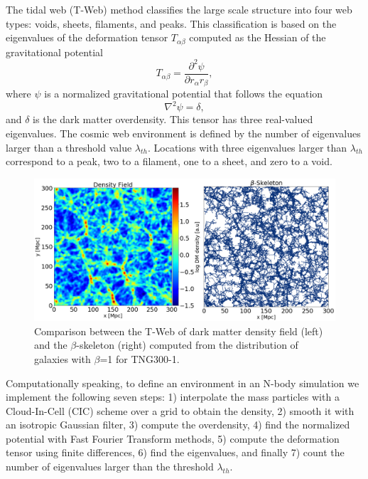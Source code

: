 \documentclass[usenatbib]{mnras}
\begin{document}
The tidal web (T-Web) method \citep{Hahn2007, Forero-Romero2009}
classifies the large scale structure into four web types: voids,
sheets, filaments, and peaks.   
This classification is based on the eigenvalues of the deformation
tensor $T_{\alpha\beta}$ computed as the Hessian of the gravitational potential 
\begin{equation}
T_{\alpha\beta}=\frac{\partial^2\psi}{\partial r_{\alpha}r_{\beta}},
\end{equation}
%
where $\psi$ is a normalized gravitational potential that follows the equation
\begin{equation}
    \nabla^2 \psi = \delta,
\end{equation}
%
and $\delta$ is the dark matter overdensity.
This tensor has three real-valued eigenvalues. 
The cosmic web environment is defined by the number of eigenvalues
larger than a threshold value $\lambda_{th}$.
Locations with three eigenvalues larger than $\lambda_{th}$ correspond
to a peak, two to a filament, one to a sheet, and zero to a void.


\begin{figure}
\centering
 \includegraphics[scale=0.3]{Figs/p_Fig1_.png}%
 \caption{Comparison between the T-Web of dark matter density field
   (left) and the $\beta$-skeleton (right) computed from the
   distribution of galaxies with $\beta$=1 for TNG300-1.}  
 \label{fig:TWebBsk}
\end{figure}


Computationally speaking, to define an environment in an N-body
simulation we implement the following seven steps: 1) interpolate the
mass particles with a Cloud-In-Cell (CIC) scheme over a grid to
obtain the density, 2) smooth it with an isotropic Gaussian filter,
3) compute the overdensity, 4) find the normalized potential with Fast
Fourier Transform  methods, 5) compute the deformation tensor using
finite differences, 6) find the eigenvalues, and finally 7) count the
number of eigenvalues larger than the threshold $\lambda_{th}$.  
\end{document}
